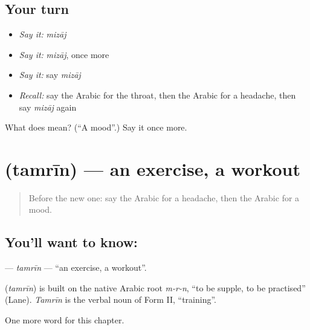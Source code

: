 \subsection*{Your turn}
\begin{itemize}
\raggedright
  \item \emph{Say it:} \emph{mizāj}
  \item \emph{Say it:} \emph{mizāj}, once more
  \item \emph{Say it:} say \emph{mizāj}
  \item \emph{Recall:} say the Arabic for the throat, then the Arabic for a headache, then say \emph{mizāj} again
\end{itemize}

\begin{tcolorbox}[breakable,colback=teal!4,colframe=teal!35!black,title={Before you move on}]
What does  mean? (\textquotedblleft{}A mood\textquotedblright{}.) Say it once more.
\end{tcolorbox}
\section[\texorpdfstring{\ar{تمرين} (tamrīn)}{تمرين (tamrīn)}]{ (tamrīn) — an exercise, a workout}

\label{lesson:AR-C169-tamrin}



\begin{quote}
Before the new one: say the Arabic for a headache, then the Arabic for a mood.
\end{quote}

\subsection*{You'll want to know: }
\textbf{} — \emph{tamrīn} — \textquotedblleft{}an exercise, a workout\textquotedblright{}.

\begin{cousinweb}
\textbf{} (\emph{tamrīn}) is built on the native Arabic root \emph{m-r-n}, \textquotedblleft{}to be supple, to be practised\textquotedblright{} (Lane). \emph{Tamrīn} is the verbal noun of Form II, \textquotedblleft{}training\textquotedblright{}.
\end{cousinweb}

\begin{grammarlens}[title={What you've built}]
One more word for this chapter.
\end{grammarlens}

